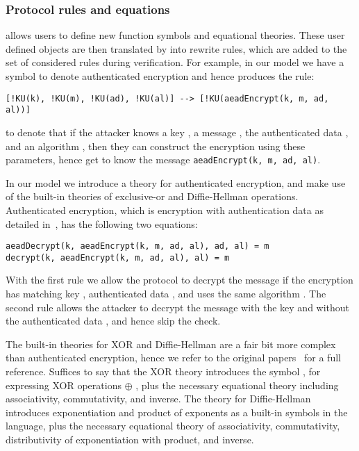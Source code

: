 \subsubsection{Protocol rules and equations}
\mTamarin{} allows users to define new function symbols and equational theories.
These user defined objects are then translated by \mTamarin{} into rewrite
rules, which are added to the set of considered rules during verification.
For example, in our model we have a symbol to denote authenticated encryption and
hence \mTamarin{} produces the rule:
%
\begin{lstlisting}
[!KU(k), !KU(m), !KU(ad), !KU(al)] --> [!KU(aeadEncrypt(k, m, ad, al))]
\end{lstlisting}
%
to denote that if the attacker knows a key , a message , the
authenticated data , and an algorithm , then they can construct
the encryption using these parameters, hence get to know the message
\lstinline{aeadEncrypt(k, m, ad, al)}.

In our model we introduce a theory for authenticated encryption, and make use of
the built-in theories of exclusive-or and Diffie-Hellman operations.
%
Authenticated encryption, which is encryption with authentication data as
detailed in~\cite{aead}, has the following two equations:
\begin{lstlisting}
aeadDecrypt(k, aeadEncrypt(k, m, ad, al), ad, al) = m
decrypt(k, aeadEncrypt(k, m, ad, al), al) = m
\end{lstlisting}
With the first rule we allow the protocol to decrypt the message  if the
encryption has matching key , authenticated data , and uses the
same algorithm .
%
The second rule allows the attacker to decrypt the message  with the key
 and without the authenticated data , and hence skip the check.

The built-in theories for XOR and Diffie-Hellman are a fair bit more complex
than authenticated encryption, hence we refer to the original
papers~\cite{DBLP:conf/csfw/DreierHRS18,DBLP:conf/csfw/SchmidtMCB12}
for a full reference.
%
Suffices to say that the XOR theory introduces the symbol , for
expressing XOR operations  $\oplus$ , plus the necessary equational theory
including associativity, commutativity, and inverse.
%
The theory for Diffie-Hellman introduces exponentiation  and product of
exponents  as a built-in symbols in the language, plus the necessary equational
theory of associativity, commutativity, distributivity of exponentiation with
product, and inverse.

